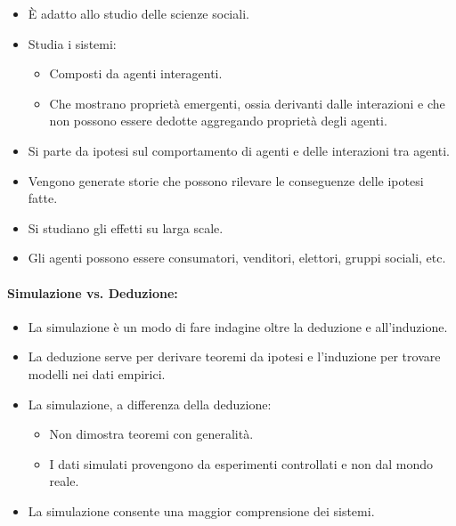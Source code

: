 \begin{itemize}
  \item È adatto allo studio delle scienze sociali. 
  \item Studia i sistemi: 
    \begin{itemize}
      \item Composti da agenti interagenti. 
      \item Che mostrano proprietà emergenti, ossia derivanti dalle interazioni e che non possono essere dedotte aggregando proprietà degli agenti. 
    \end{itemize}
  \item Si parte da ipotesi sul comportamento di agenti e delle interazioni tra agenti. 
  \item Vengono generate storie che possono rilevare le conseguenze delle ipotesi fatte. 
  \item Si studiano gli effetti su larga scale. 
  \item Gli agenti possono essere consumatori, venditori, elettori, gruppi sociali, etc. 
\end{itemize}

\paragraph{Simulazione vs. Deduzione:}

\begin{itemize}
  \item La simulazione è un modo di fare indagine oltre la deduzione e all'induzione. 
  \item La deduzione serve per derivare teoremi da ipotesi e l'induzione per trovare modelli nei dati empirici. 
  \item La simulazione, a differenza della deduzione:
    \begin{itemize}
      \item Non dimostra teoremi con generalità. 
      \item I dati simulati provengono da esperimenti controllati e non dal mondo reale. 
    \end{itemize}
  \item La simulazione consente una maggior comprensione dei sistemi.
\end{itemize}
